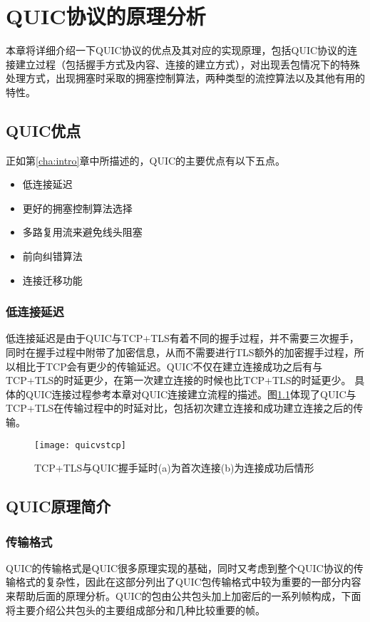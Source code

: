 \chapter{QUIC协议的原理分析}

\label{cha:analysis}
本章将详细介绍一下QUIC协议的优点及其对应的实现原理，包括QUIC协议的连接建立过程（包括握手方式及内容、连接的建立方式），对出现丢包情况下的特殊处理方式，出现拥塞时采取的拥塞控制算法，两种类型的流控算法以及其他有用的特性。
\section{QUIC优点}
正如第\ref{cha:intro}章中所描述的，QUIC的主要优点有以下五点。
\begin{itemize}
  \item 低连接延迟
  \item 更好的拥塞控制算法选择
  \item 多路复用流来避免线头阻塞
  \item 前向纠错算法
  \item 连接迁移功能
\end{itemize}
\subsection{低连接延迟}
低连接延迟是由于QUIC与TCP+TLS有着不同的握手过程，并不需要三次握手，同时在握手过程中附带了加密信息，从而不需要进行TLS额外的加密握手过程，所以相比于TCP会有更少的传输延迟。QUIC不仅在建立连接成功之后有与TCP+TLS的时延更少，在第一次建立连接的时候也比TCP+TLS的时延更少。 具体的QUIC连接过程参考本章对QUIC连接建立流程的描述。图\ref{fig:quicvstcp}体现了QUIC与TCP+TLS在传输过程中的时延对比，包括初次建立连接和成功建立连接之后的传输。
\begin{figure}
  \centering
  \texttt{[image: quicvstcp]}
  \caption{TCP+TLS与QUIC握手延时(a)为首次连接(b)为连接成功后情形}
  \label{fig:quicvstcp}
\end{figure}

\section{QUIC原理简介}
\subsection{传输格式}
QUIC的传输格式是QUIC很多原理实现的基础，同时又考虑到整个QUIC协议的传输格式的复杂性，因此在这部分列出了QUIC包传输格式中较为重要的一部分内容来帮助后面的原理分析。QUIC的包由公共包头加上加密后的一系列帧构成，下面将主要介绍公共包头的主要组成部分和几种比较重要的帧。
